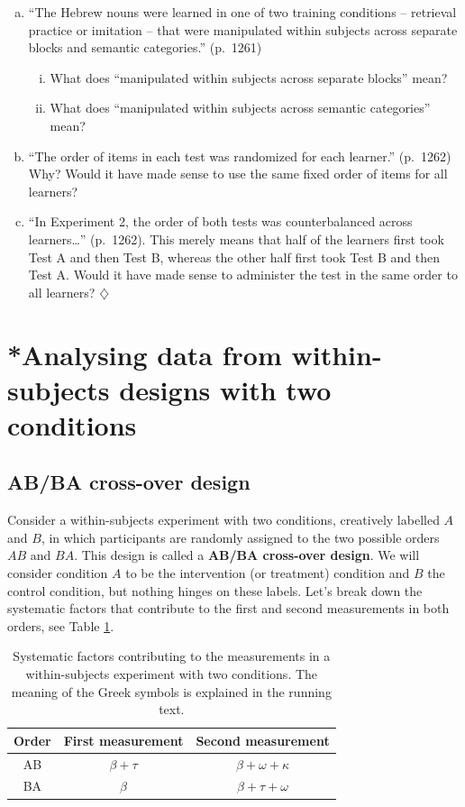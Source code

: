 \documentclass[a4paper]{tufte-book}\usepackage[]{graphicx}\usepackage[]{xcolor}
\newcommand{\term}[1]{\textbf{#1}}
\newcommand*{\parend}[1][$\diamondsuit$]{%
\leavevmode\unskip\penalty9999 \hbox{}\nobreak\hfill
    \quad\hbox{#1}%
}
\begin{document}
\begin{enumerate}[(a)]
\item ``The Hebrew nouns were learned in one of two training conditions -- retrieval practice or imitation -- that were manipulated within subjects across separate blocks and semantic categories.'' (p.~1261)
\begin{enumerate}[i.]
  \item What does ``manipulated within subjects across separate blocks'' mean?
  \item What does ``manipulated within subjects across semantic categories'' mean?
\end{enumerate}

\item ``The order of items in each test was randomized for each learner.'' (p.~1262) 
        Why?
        Would it have made sense to use the same fixed order of items for all learners?

\item ``In Experiment 2, the order of both tests was counterbalanced across learners\dots'' (p.~1262).
        This merely means that half of the learners first took Test A and then Test B, 
        whereas the other half first took Test B and then Test A.
        Would it have made sense to administer the test in the same order to all learners?\parend
\end{enumerate}

\section{*Analysing data from within-subjects designs with two conditions}
\subsection{AB/BA cross-over design}
  Consider a within-subjects experiment with two conditions, creatively labelled $A$ and $B$, 
  in which participants are randomly assigned to the two possible orders $AB$ and $BA$.
  This design is called a \term{AB/BA cross-over design}.
  We will consider condition $A$ to be the intervention (or treatment) condition
  and $B$ the control condition, but nothing hinges on these labels.
  Let's break down the systematic factors that contribute 
  to the first and second measurements in both orders, see Table \ref{tab:analysiswithin}.
  
\begin{table}[h]
  \centering
  \caption{Systematic factors contributing to the measurements in a within-subjects experiment with two conditions. The meaning of the Greek symbols is explained in the running text.}
  \label{tab:analysiswithin}
  \begin{tabular}{ccc}
    \toprule 
    Order & First measurement & Second measurement \\
    \midrule
    AB    & $\beta + \tau$    & $\beta + \omega + \kappa$ \\
    BA    & $\beta$           & $\beta + \tau + \omega$ \\
    \bottomrule
  \end{tabular}
\end{table}
\end{document}
